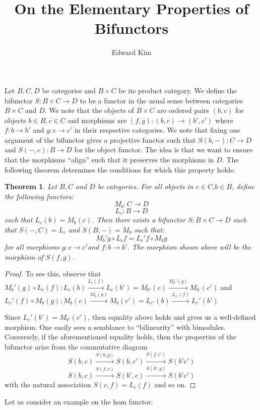 \documentclass[12pt]{article}
\title{On the Elementary Properties of Bifunctors}
\author{Edward Kim}
\newtheorem{theorem}{Theorem}[section]
\begin{document}
\maketitle
\hrulefill

Let $B,C,D$ be categories and $B \times C$ be its product category. We define the bifunctor $S: B \times C \rightarrow D$ to be a functor in the usual sense between categories $B \times C$ and $D$. We note that the objects of $B \times C$ are ordered pairs $(b,c)$ for objects $b \in B, c \in C$ and morphisms are $(f,g): (b,c) \rightarrow (b',c')$ where $f:b \rightarrow b'$ and $g:c \rightarrow c'$ in their respective categories. We note that fixing one argument of the bifunctor gives a projective functor such that $S(b,-): C \rightarrow D$ and $S(-,c): B 
\rightarrow D$ for the object functor. The idea is that we want to ensure that the morphisms ``align'' such that it preserves the morphisms in $D$. The following theorem determines the conditions for which this property holds:

\begin{theorem}
 Let $B,C$ and $D$ be categories. For all objects in $c \in C$,$b \in B$, define the following functors: 
 $$M_b : C \rightarrow D $$
 $$L_c : B \rightarrow D $$
 such that $L_c(b) = M_b(c)$. Then there exists a bifunctor $S: B \times C \rightarrow D$ such that $S(-,C) = L_c$ and $S(B,-) = M_b$ such that:
 $$ M_b'g \circ L_cf = L_c'f \circ M_bg $$ for all morphisms $g: c \rightarrow c'$and $f:b \rightarrow b'$. The morphism shown above will be the morphism of $S(f,g)$.
\end{theorem}

\begin{proof}
To see this, observe that $M_b'(g) \circ L_c(f): L_c(b) \xrightarrow{L_c(f)} L_c(b') = M_{b'}(c) \xrightarrow{M_b'(g)} M_{b'}(c')$  
and $L_c'(f) \circ M_b(g): M_b(c) \xrightarrow{M_b(g)} M_b(c') = L_{c'}(b) \xrightarrow{L_{c'}(f)} L_c'(b') $ 
 
Since $L_c'(b') = M_{b'}(c')$, then equality above holds and gives us a well-defined morphism. One easily sees a semblance to ``bilinearity'' with bimodules. Conversely, if the aforementioned equality holds, then the properties of the bifunctor arise from the commutative diagram 
 $$S(b,c) \xrightarrow{S(b,g)} S(b,c') \xrightarrow{S(f,c')} S(b'c') $$
 $$S(b,c) \xrightarrow{S(f,c)} S(b',c) \xrightarrow{S(b',g)} S(b'c') $$
 with the natural association $S(c,f) = L_c(f)$ and so on.
\end{proof}

Let us consider an example on the hom functor:
\end{document}
